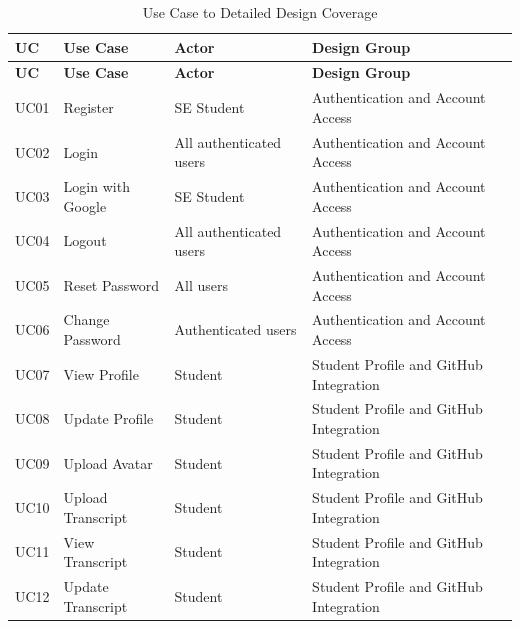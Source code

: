 \setlength{\tabcolsep}{2pt}
\scriptsize
\begin{longtable}{|>{\centering\arraybackslash}m{0.8cm}|>{\raggedright\arraybackslash}m{3.0cm}|>{\raggedright\arraybackslash}m{2.4cm}|>{\raggedright\arraybackslash}m{4.8cm}|}
\caption{Use Case to Detailed Design Coverage}
\label{tab:uc_detailed_design_coverage}
\\
\hline
\textbf{UC} & \textbf{Use Case} & \textbf{Actor} & \textbf{Design Group} \\
\hline
\endfirsthead
\hline
\textbf{UC} & \textbf{Use Case} & \textbf{Actor} & \textbf{Design Group} \\
\hline
\endhead

UC01 & Register & SE Student & Authentication and Account Access \\
\hline

UC02 & Login & All authenticated users & Authentication and Account Access \\
\hline

UC03 & Login with Google & SE Student & Authentication and Account Access \\
\hline

UC04 & Logout & All authenticated users & Authentication and Account Access \\
\hline

UC05 & Reset Password & All users & Authentication and Account Access \\
\hline

UC06 & Change Password & Authenticated users & Authentication and Account Access \\
\hline

UC07 & View Profile & Student & Student Profile and GitHub Integration \\
\hline

UC08 & Update Profile & Student & Student Profile and GitHub Integration \\
\hline

UC09 & Upload Avatar & Student & Student Profile and GitHub Integration \\
\hline

UC10 & Upload Transcript & Student & Student Profile and GitHub Integration \\
\hline

UC11 & View Transcript & Student & Student Profile and GitHub Integration \\
\hline

UC12 & Update Transcript & Student & Student Profile and GitHub Integration \\
\hline


\end{longtable}
